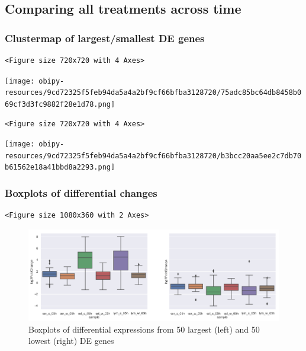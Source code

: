 \documentclass[a4paper]{article}
\begin{document}
\clearpage
\subsection{Comparing all treatments across time}
\label{sec:orgedc71f0}
\subsubsection{Clustermap of largest/smallest DE genes}
\label{sec:org817d5b8}
\begin{verbatim}
<Figure size 720x720 with 4 Axes>
\end{verbatim}

\begin{center}
\texttt{[image: obipy-resources/9cd72325f5feb94da5a4a2bf9cf66bfba3128720/75adc85bc64db8458b069cf3d3fc9882f28e1d78.png]}
\end{center}

\begin{verbatim}
<Figure size 720x720 with 4 Axes>
\end{verbatim}

\begin{center}
\texttt{[image: obipy-resources/9cd72325f5feb94da5a4a2bf9cf66bfba3128720/b3bcc20aa5ee2c7db70b61562e18a41bbd8a2293.png]}
\end{center}


\subsubsection{Boxplots of differential changes}
\label{sec:org874876e}

\begin{verbatim}
<Figure size 1080x360 with 2 Axes>
\end{verbatim}

\begin{figure}[htbp]
\centering
\includegraphics[width=.9\linewidth]{obipy-resources/pairings_timingsr_boxplots.png}
\caption{\label{pairings_timings_boxplots}
Boxplots of differential expressions from 50 largest (left) and 50 lowest (right) DE genes}
\end{figure}
\end{document}

